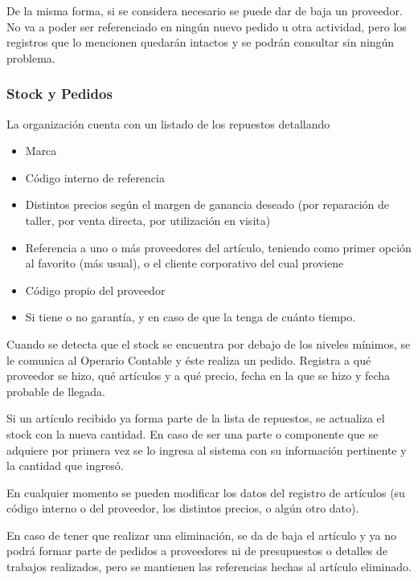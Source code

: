 \documentclass[12pt]{extarticle}
\begin{document}
\begin{spacing}{1.2}
        De la misma forma, si se considera necesario se puede dar de baja un proveedor. No va a poder ser referenciado en ningún nuevo pedido u otra actividad, pero los registros que lo mencionen quedarán intactos y se podrán consultar sin ningún problema.

        \subsubsection{Stock y Pedidos}

        La organización cuenta con un listado de los repuestos detallando 
        \begin{itemize}
            \item Marca
            \item Código interno de referencia
            \item Distintos precios según el margen de ganancia deseado (por reparación de taller, por venta directa, por utilización en visita)
            \item Referencia a uno o más proveedores del artículo, teniendo como primer opción al favorito (más usual), o el cliente corporativo del cual proviene
            \item Código propio del proveedor
            \item Si tiene o no garantía, y en caso de que la tenga de cuánto tiempo.
        \end{itemize}

        Cuando se detecta que el stock se encuentra por debajo de los niveles mínimos, se le comunica al Operario Contable y éste realiza un pedido. Registra a qué proveedor se hizo, qué artículos y a qué precio, fecha en la que se hizo y fecha probable de llegada. 

        Si un artículo recibido ya forma parte de la lista de repuestos, se actualiza el stock con la nueva cantidad. En caso de ser una parte o componente que se adquiere por primera vez se lo ingresa al sistema con su información pertinente y la cantidad que ingresó. 
            
        En cualquier momento se pueden modificar los datos del registro de artículos (su código interno o del proveedor, los distintos precios, o algún otro dato).

        En caso de tener que realizar una eliminación, se da de baja el artículo y ya no podrá formar parte de pedidos a proveedores ni de presupuestos o detalles de trabajos realizados, pero se mantienen las referencias hechas al artículo eliminado.


\end{spacing}
\end{document}
